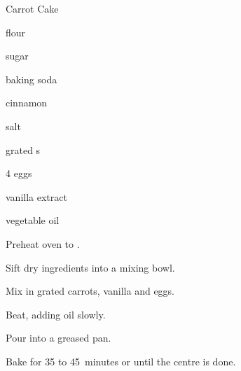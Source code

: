 \begin{recipe}{Carrot Cake}{}{}

\begin{ingredients}
\item {} flour
\item {} sugar
\item {} baking soda
\item {} cinnamon
\item {} salt
\item {} grated s
\item 4 eggs
\item {} vanilla extract
\item \C{\half} vegetable oil
\end{ingredients}

\begin{directions}
\item Preheat oven to .
\item Sift dry ingredients into a mixing bowl.
\item Mix in grated carrots, vanilla and eggs.
\item Beat, adding oil slowly.
\item Pour into a greased pan.
\item Bake for 35 to 45~minutes or until the centre is done.
\end{directions}
\end{recipe}
